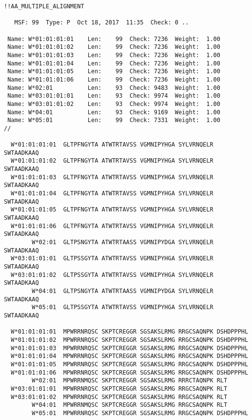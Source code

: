\begin{verbatim}
!!AA_MULTIPLE_ALIGNMENT

   MSF: 99  Type: P  Oct 18, 2017  11:35  Check: 0 ..

 Name: W*01:01:01:01    Len:    99  Check: 7236  Weight:  1.00
 Name: W*01:01:01:02    Len:    99  Check: 7236  Weight:  1.00
 Name: W*01:01:01:03    Len:    99  Check: 7236  Weight:  1.00
 Name: W*01:01:01:04    Len:    99  Check: 7236  Weight:  1.00
 Name: W*01:01:01:05    Len:    99  Check: 7236  Weight:  1.00
 Name: W*01:01:01:06    Len:    99  Check: 7236  Weight:  1.00
 Name: W*02:01          Len:    93  Check: 9483  Weight:  1.00
 Name: W*03:01:01:01    Len:    93  Check: 9974  Weight:  1.00
 Name: W*03:01:01:02    Len:    93  Check: 9974  Weight:  1.00
 Name: W*04:01          Len:    93  Check: 9169  Weight:  1.00
 Name: W*05:01          Len:    99  Check: 7331  Weight:  1.00
//

  W*01:01:01:01  GLTPFNGYTA ATWTRTAVSS VGMNIPYHGA SYLVRNQELR SWTAADKAAQ
  W*01:01:01:02  GLTPFNGYTA ATWTRTAVSS VGMNIPYHGA SYLVRNQELR SWTAADKAAQ
  W*01:01:01:03  GLTPFNGYTA ATWTRTAVSS VGMNIPYHGA SYLVRNQELR SWTAADKAAQ
  W*01:01:01:04  GLTPFNGYTA ATWTRTAVSS VGMNIPYHGA SYLVRNQELR SWTAADKAAQ
  W*01:01:01:05  GLTPFNGYTA ATWTRTAVSS VGMNIPYHGA SYLVRNQELR SWTAADKAAQ
  W*01:01:01:06  GLTPFNGYTA ATWTRTAVSS VGMNIPYHGA SYLVRNQELR SWTAADKAAQ
        W*02:01  GLTPSNGYTA ATWTRTAASS VGMNIPYDGA SYLVRNQELR SWTAADKAAQ
  W*03:01:01:01  GLTPSSGYTA ATWTRTAVSS VGMNIPYHGA SYLVRNQELR SWTAADKAAQ
  W*03:01:01:02  GLTPSSGYTA ATWTRTAVSS VGMNIPYHGA SYLVRNQELR SWTAADKAAQ
        W*04:01  GLTPSNGYTA ATWTRTAASS VGMNIPYDGA SYLVRNQELR SWTAADKAAQ
        W*05:01  GLTPSSGYTA ATWTRTAVSS VGMNIPYHGA SYLVRNQELR SWTAADKAAQ

  W*01:01:01:01  MPWRRNRQSC SKPTCREGGR SGSAKSLRMG RRGCSAQNPK DSHDPPPHL
  W*01:01:01:02  MPWRRNRQSC SKPTCREGGR SGSAKSLRMG RRGCSAQNPK DSHDPPPHL
  W*01:01:01:03  MPWRRNRQSC SKPTCREGGR SGSAKSLRMG RRGCSAQNPK DSHDPPPHL
  W*01:01:01:04  MPWRRNRQSC SKPTCREGGR SGSAKSLRMG RRGCSAQNPK DSHDPPPHL
  W*01:01:01:05  MPWRRNRQSC SKPTCREGGR SGSAKSLRMG RRGCSAQNPK DSHDPPPHL
  W*01:01:01:06  MPWRRNRQSC SKPTCREGGR SGSAKSLRMG RRGCSAQNPK DSHDPPPHL
        W*02:01  MPWRRNMQSC SKPTCREGGR SGSAKSLRMG RRRCTAQNPK RLT
  W*03:01:01:01  MPWRRNRQSC SKPTCREGGR SGSAKSLRMG RRGCSAQNPK RLT
  W*03:01:01:02  MPWRRNRQSC SKPTCREGGR SGSAKSLRMG RRGCSAQNPK RLT
        W*04:01  MPWRRNMQSC SKPTCREGGR SGSAKSLRMG RRGCSAQNPK RLT
        W*05:01  MPWRRNRQSC SKPTCREGGR SGSAKSLRMG RRGCSAQNPK DSHDPPPHL
\end{verbatim}

